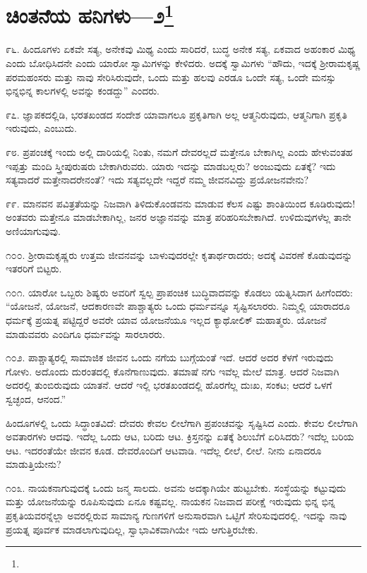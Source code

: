 \newpage

\chapter[ಚಿಂತನೆಯ ಹನಿಗಳು—೨]{ಚಿಂತನೆಯ ಹನಿಗಳು—೨\protect\footnote{}}

೯೬. ಹಿಂದೂಗಳು ಏಕವೇ ಸತ್ಯ, ಅನೇಕವು ಮಿಥ್ಯ ಎಂದು ಸಾರಿದರೆ, ಬುದ್ಧ ಅನೇಕ ಸತ್ಯ, ಏಕವಾದ ಅಹಂಕಾರ ಮಿಥ್ಯ ಎಂದು ಬೋಧಿಸಿದನೇ ಎಂದು ಯಾರೋ ಸ್ವಾಮಿಗಳನ್ನು ಕೇಳಿದರು. ಅದಕ್ಕೆ ಸ್ವಾಮಿಗಳು “ಹೌದು, ಇದಕ್ಕೆ ಶ‍್ರೀರಾಮಕೃಷ್ಣ ಪರಮಹಂಸರು ಮತ್ತು ನಾವು ಸೇರಿಸಿರುವುದೇ, ಒಂದು ಮತ್ತು ಹಲವು ಎರಡೂ ಒಂದೇ ಸತ್ಯ, ಒಂದೇ ಮನಸ್ಸು ಭಿನ್ನಭಿನ್ನ ಕಾಲಗಳಲ್ಲಿ ಅವನ್ನು ಕಂಡದ್ದು” ಎಂದರು.

೯೭. ಜ್ಞಾಪಕದಲ್ಲಿಡಿ, ಭರತಖಂಡದ ಸಂದೇಶ ಯಾವಾಗಲೂ ಪ್ರಕೃತಿಗಾಗಿ ಅಲ್ಲ ಆತ್ಮನಿರುವುದು, ಆತ್ಮನಿಗಾಗಿ ಪ್ರಕೃತಿ ಇರುವುದು, ಎಂಬುದು.

೯೮. ಪ್ರಪಂಚಕ್ಕೆ ಇಂದು ಅಲ್ಲಿ ದಾರಿಯಲ್ಲಿ ನಿಂತು, ನಮಗೆ ದೇವರಲ್ಲದೆ ಮತ್ತೇನೂ ಬೇಕಾಗಿಲ್ಲ ಎಂದು ಹೇಳುವಂತಹ ಇಪ್ಪತ್ತು ಮಂದಿ ಸ್ತ್ರೀಪುರುಷರು ಬೇಕಾಗಿರುವರು. ಯಾರು ಇದನ್ನು ಮಾಡಬಲ್ಲರು? ಅಂಜುವುದು ಏತಕ್ಕೆ? ಇದು ಸತ್ಯವಾದರೆ ಮತ್ತೇನಾದರೇನಂತೆ? ಇದು ಸತ್ಯವಲ್ಲದೇ ಇದ್ದರೆ ನಮ್ಮ ಜೀವನವಿದ್ದು ಪ್ರಯೋಜನವೇನು?

೯೯. ಮಾನವನ ಪವಿತ್ರತೆಯನ್ನು ನಿಜವಾಗಿ ತಿಳಿದುಕೊಂಡವನು ಮಾಡುವ ಕೆಲಸ ಎಷ್ಟು ಶಾಂತಿಯಿಂದ ಕೂಡಿರುವುದು! ಅಂತವರು ಮತ್ತೇನೂ ಮಾಡಬೇಕಾಗಿಲ್ಲ, ಜನರ ಅಜ್ಞಾನವನ್ನು ಮಾತ್ರ ಪರಿಹರಿಸಬೇಕಾಗಿದೆ. ಉಳಿದುವುಗಳೆಲ್ಲ ತಾನೇ ಅಣಿಯಾಗುವುವು.

೧೦೦. ಶ‍್ರೀರಾಮಕೃಷ್ಣರು ಉತ್ತಮ ಜೀವನವನ್ನು ಬಾಳುವುದರಲ್ಲೇ ಕೃತಾರ್ಥರಾದರು; ಅದಕ್ಕೆ ವಿವರಣೆ ಕೊಡುವುದನ್ನು ಇತರರಿಗೆ ಬಿಟ್ಟರು.

೧೦೧. ಯಾರೋ ಒಬ್ಬರು ಶಿಷ್ಯರು ಅವರಿಗೆ ಸ್ವಲ್ಪ ಪ್ರಾಪಂಚಿಕ ಬುದ್ಧಿವಾದವನ್ನು ಕೊಡಲು ಯತ್ನಿಸಿದಾಗ ಹೀಗೆಂದರು: “ಯೋಜನೆ, ಯೋಜನೆ, ಆದಕಾರಣವೇ ಪಾಶ್ಚಾತ್ಯರು ಒಂದು ಧರ್ಮವನ್ನೂ ಸೃಷ್ಟಿಸಲಾರರು. ನಿಮ್ಮಲ್ಲಿ ಯಾರಾದರೂ ಧರ್ಮಕ್ಕೆ ಪ್ರಯತ್ನ ಪಟ್ಟಿದ್ದರೆ ಅವರೇ ಯಾವ ಯೋಜನೆಯೂ ಇಲ್ಲದ ಕ್ಯಾಥೋಲಿಕ್ ಮಹಾತ್ಮರು. ಯೋಜನೆ ಮಾಡುವವರು ಎಂದಿಗೂ ಧರ್ಮವನ್ನು ಸಾರಲಾರರು.

೧೦೨. ಪಾಶ್ಚಾತ್ಯರಲ್ಲಿ ಸಾಮಾಜಿಕ ಜೀವನ ಒಂದು ನಗೆಯ ಬುಗ್ಗೆಯಂತೆ ಇದೆ. ಆದರೆ ಅದರ ಕೆಳಗೆ ಇರುವುದು ಗೋಳು. ಅದೊಂದು ದುರಂತದಲ್ಲಿ ಕೊನೆಗಾಣುವುದು. ತಮಾಷೆ ನಗು ಇವೆಲ್ಲ ಮೇಲೆ ಮಾತ್ರ. ಆದರೆ ನಿಜವಾಗಿ ಅದರಲ್ಲಿ ತುಂಬಿರುವುದು ಯಾತನೆ. ಆದರೆ ಇಲ್ಲಿ ಭರತಖಂಡದಲ್ಲಿ ಹೊರಗೆಲ್ಲ ದುಃಖ, ಸಂಕಟ; ಆದರೆ ಒಳಗೆ ಸ್ವಚ್ಛಂದ, ಆನಂದ.”

ಹಿಂದೂಗಳಲ್ಲಿ ಒಂದು ಸಿದ್ಧಾಂತವಿದೆ: ದೇವರು ಕೇವಲ ಲೀಲೆಗಾಗಿ ಪ್ರಪಂಚವನ್ನು ಸೃಷ್ಟಿಸಿದ ಎಂದು. ಕೇವಲ ಲೀಲೆಗಾಗಿ ಅವತಾರಗಳು ಆದವು. ಇದೆಲ್ಲ ಒಂದು ಆಟ, ಬರಿದು ಆಟ. ಕ್ರಿಸ್ತನನ್ನು ಏತಕ್ಕೆ ಶಿಲುಬೆಗೆ ಏರಿಸಿದರು? ಇದೆಲ್ಲ ಬರಿಯ ಆಟ. ಇದರಂತೆಯೇ ಜೀವನ ಕೂಡ. ದೇವರೊಂದಿಗೆ ಆಟವಾಡಿ. ಇದೆಲ್ಲ ಲೀಲೆ, ಲೀಲೆ. ನೀನು ಏನಾದರೂ ಮಾಡುತ್ತಿಯೇನು?

೧೦೩. ನಾಯಕನಾಗುವುದಕ್ಕೆ ಒಂದು ಜನ್ಮ ಸಾಲದು. ಅವನು ಅದಕ್ಕಾಗಿಯೇ ಹುಟ್ಟಬೇಕು. ಸಂಸ್ಥೆಯನ್ನು ಕಟ್ಟುವುದು ಮತ್ತು ಯೋಜನೆಯನ್ನು ರೂಪಿಸುವುದು ಏನೂ ಕಷ್ಟವಲ್ಲ. ನಾಯಕನ ನಿಜವಾದ ಪರೀಕ್ಷೆ ಇರುವುದು ಭಿನ್ನ ಭಿನ್ನ ಪ್ರಕೃತಿಯವರನ್ನೆಲ್ಲಾ ಅವರಲ್ಲಿರುವ ಸಾಮಾನ್ಯ ಗುಣಗಳಿಗೆ ಅನುಸಾರವಾಗಿ ಒಟ್ಟಿಗೆ ಸೇರಿಸುವುದರಲ್ಲಿ. ಇದನ್ನು ನಾವು ಪ್ರಯತ್ನ ಪೂರ್ವಕ ಮಾಡಲಾಗುವುದಿಲ್ಲ, ಸ್ವಾಭಾವಿಕವಾಗಿಯೇ ಇದು ಆಗುತ್ತಿರಬೇಕು.


